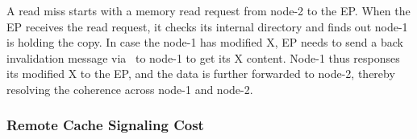 \ifx\undefined\stale
A read miss starts with a memory read request from node-2 to the EP. 
When the EP receives the read request, it checks its internal directory and finds out node-1 is holding the copy. 
In case the node-1 has modified X, EP needs to send a back invalidation message via \cxlbi~to node-1 to get its X content. 
Node-1 thus responses its modified X to the EP, and the data is further forwarded to node-2, thereby resolving the coherence across node-1 and node-2. 
\fi

\subsubsection{Remote Cache Signaling Cost} \label{subsec:remote_fetching}

